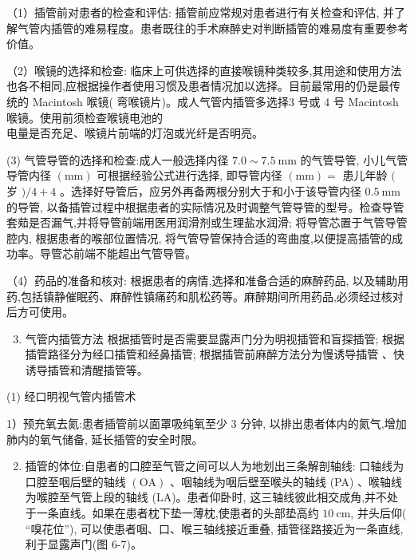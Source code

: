 \documentclass[10pt]{article}
\begin{document}
（1）插管前对患者的检查和评估: 插管前应常规对患者进行有关检查和评估, 并了解气管内插管的难易程度。患者既往的手术麻醉史对判断插管的难易度有重要参考价值。

（2）喉镜的选择和检查: 临床上可供选择的直接喉镜种类较多,其用途和使用方法也各不相同,应根据操作者使用习惯及患者情况加以选择。目前最常用的仍是最传统的 Macintosh 喉镜( 弯喉镜片)。成人气管内插管多选择3 号或 4 号 Macintosh 喉镜。使用前须检查喉镜电池的\\
电量是否充足、喉镜片前端的灯泡或光纤是否明亮。

(3) 气管导管的选择和检查:成人一般选择内径 $7.0 \sim 7.5 \mathrm{~mm}$ 的气管导管, 小儿气管导管内径 $(\mathrm{mm})$ 可根据经验公式进行选择, 即导管内径 $(\mathrm{mm})=$ 患儿年龄 $($ 岁 $) / 4+4$ 。选择好导管后，应另外再备两根分别大于和小于该导管内径 $0.5 \mathrm{~mm}$ 的导管, 以备插管过程中根据患者的实际情况及时调整气管导管的型号。检查导管套䓡是否漏气,并将导管前端用医用润滑剂或生理盐水润滑; 将导管芯置于气管导管腔内, 根据患者的喉部位置情况, 将气管导管保持合适的弯曲度,以便提高插管的成功率。导管芯前端不能超出气管导管。

（4）药品的准备和核对: 根据患者的病情,选择和准备合适的麻醉药品, 以及辅助用药,包括镇静催眠药、麻醉性镇痛药和肌松药等。麻醉期间所用药品,必须经过核对后方可使用。

\begin{enumerate}
  \setcounter{enumi}{2}
  \item 气管内插管方法 根据插管时是否需要显露声门分为明视插管和盲探插管; 根据插管路径分为经口插管和经鼻插管; 根据插管前麻醉方法分为慢诱导插管 、快诱导插管和清醒插管等。
\end{enumerate}

(1) 经口明视气管内插管术

1）预充氧去氮:患者插管前以面罩吸纯氧至少 3 分钟, 以排出患者体内的氮气,增加肺内的氧气储备, 延长插管的安全时限。

\begin{enumerate}
  \setcounter{enumi}{1}
  \item 插管的体位:自患者的口腔至气管之间可以人为地划出三条解剖轴线: 口轴线为口腔至咽后壁的轴线 $(\mathrm{OA})$ 、咽轴线为咽后壁至喉头的轴线 (PA) 、喉轴线为喉腔至气管上段的轴线 (LA)。患者仰卧时, 这三轴线彼此相交成角,并不处于一条直线。如果在患者枕下垫一薄枕,使患者的头部垫高约 $10 \mathrm{~cm}$, 并头后仰( “嗅花位”), 可以使患者咽、口、喉三轴线接近重叠, 插管径路接近为一条直线, 利于显露声门(图 6-7)。
\end{enumerate}
\end{document}
